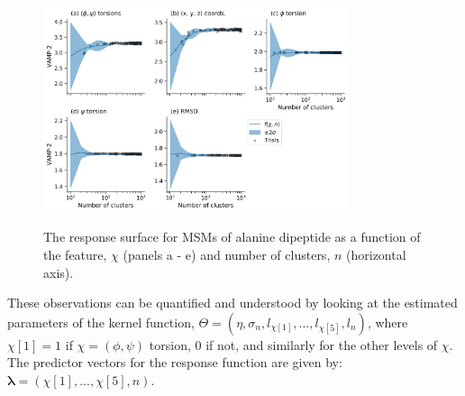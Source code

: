 


\begin{figure}
    \centering
    \caption{The response surface for MSMs of alanine dipeptide as a function of the feature, $\chi$ (panels a - e) and number of clusters, $n$ (horizontal axis).  }
    \includegraphics[width=0.8\textwidth]{chapters/msm_optimization/figures/ala1_response_surface.png}
    \label{fig:ala1_response}
\end{figure}

These observations can be quantified and understood by looking at the estimated parameters of the kernel function, $\Theta = (\eta, \sigma_n, l_{\chi[1]}, ..., l_{\chi[5]}, l_{n}) $, where $\chi[1] = 1$ if $\chi = (\phi, \psi)$ torsion, $0$ if not, and similarly for the other levels of $\chi$. The predictor vectors for the response function are given by: $\mathbf{\lambda} = \left(\chi[1],...,\chi[5],n\right)$.

